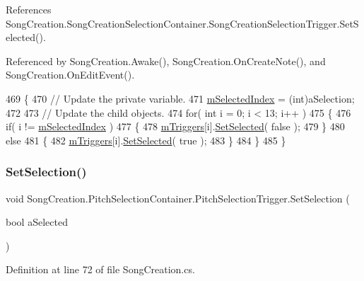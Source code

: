 References Song\+Creation.\+Song\+Creation\+Selection\+Container.\+Song\+Creation\+Selection\+Trigger.\+Set\+Selected().



Referenced by Song\+Creation.\+Awake(), Song\+Creation.\+On\+Create\+Note(), and Song\+Creation.\+On\+Edit\+Event().


\begin{DoxyCode}
469         \{
470             \textcolor{comment}{// Update the private variable.}
471             \hyperlink{group___s_c_handlers_ga33015c7ac7e8cebb24b1fc97c70b4ed7}{mSelectedIndex} = (int)aSelection;
472 
473             \textcolor{comment}{// Update the child objects.}
474             \textcolor{keywordflow}{for}( \textcolor{keywordtype}{int} i = 0; i < 13; i++ )
475             \{
476                 \textcolor{keywordflow}{if}( i != \hyperlink{group___s_c_handlers_ga33015c7ac7e8cebb24b1fc97c70b4ed7}{mSelectedIndex} )
477                 \{
478                     \hyperlink{group___s_c_handlers_ga89fbb92f878e65f27bee6edbf920da22}{mTriggers}[i].\hyperlink{group___s_c_handlers_ga477673c43fb3b828ed54d06d00e93f08}{SetSelected}( \textcolor{keyword}{false} );
479                 \}
480                 \textcolor{keywordflow}{else}
481                 \{
482                     \hyperlink{group___s_c_handlers_ga89fbb92f878e65f27bee6edbf920da22}{mTriggers}[i].\hyperlink{group___s_c_handlers_ga477673c43fb3b828ed54d06d00e93f08}{SetSelected}( \textcolor{keyword}{true} );
483                 \}
484             \}
485         \}
\end{DoxyCode}
\mbox{\label{group___s_c_handlers_ga0eebfa085bd5326ed4cb4981cf02d2e0}} 
\subsubsection{\texorpdfstring{Set\+Selection()}{SetSelection()}}
{\footnotesize\ttfamily void Song\+Creation.\+Pitch\+Selection\+Container.\+Pitch\+Selection\+Trigger.\+Set\+Selection (\begin{DoxyParamCaption}\item[{bool}]{a\+Selected }\end{DoxyParamCaption})}



Definition at line 72 of file Song\+Creation.\+cs.



